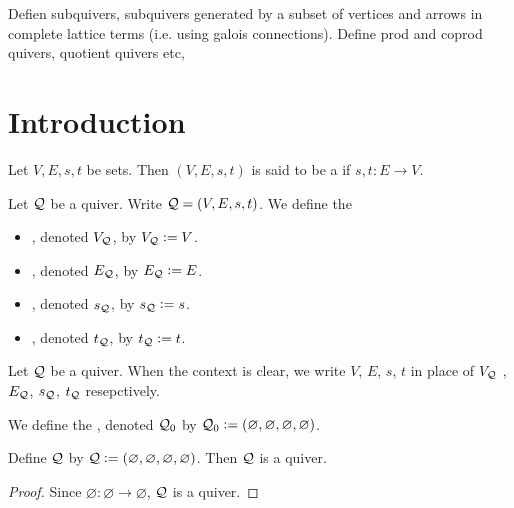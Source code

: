 \documentclass{book}
\begin{document}
	 Defien subquivers, subquivers generated by a subset of vertices and arrows in complete lattice terms (i.e. using galois connections). Define prod and coprod quivers, quotient quivers etc, 
	
	\section{Introduction}
	
	
	\begin{defn}
		Let $V, E, s, t$ be sets. Then $(V, E, s, t)$ is said to be a  if $s,t:E \rightarrow V$. 
	\end{defn}
	
	\begin{defn}
		Let $\mathcal{Q}$ be a quiver. Write $\mathcal{Q} = (V, E, s, t)$. We define the 
		\begin{itemize}
			\item {}, denoted $V_{\mathcal{Q}}$, by $V_{\mathcal{Q}} \vcentcolon= V$.
			\item {}, denoted $E_{\mathcal{Q}}$, by $E_{\mathcal{Q}} \vcentcolon= E$.
			\item {}, denoted $s_{\mathcal{Q}}$, by $s_{\mathcal{Q}} \vcentcolon= s$.
			\item {}, denoted $t_{\mathcal{Q}}$, by $t_{\mathcal{Q}} \vcentcolon= t$.
		\end{itemize}
	\end{defn}
	
	\begin{note}
		Let $\mathcal{Q}$ be a quiver. When the context is clear, we write $V$, $E$, $s$, $t$ in place of $V_{\mathcal{Q}}$ , $E_{\mathcal{Q}}$, $s_{\mathcal{Q}}$, $t_{\mathcal{Q}}$ resepctively.
	\end{note}
	
	\begin{defn}
		We define the , denoted $\mathcal{Q}_0$ by $\mathcal{Q}_0 \vcentcolon= (\varnothing, \varnothing, \varnothing, \varnothing)$.
	\end{defn}
	
	\begin{ex}
		Define $\mathcal{Q}$ by $\mathcal{Q} \vcentcolon= (\varnothing, \varnothing, \varnothing, \varnothing)$. Then $\mathcal{Q}$ is a quiver.
	\end{ex}
	
	\begin{proof}
		Since $\varnothing: \varnothing \rightarrow \varnothing$, $\mathcal{Q}$ is a quiver.
	\end{proof}
	
\end{document}
